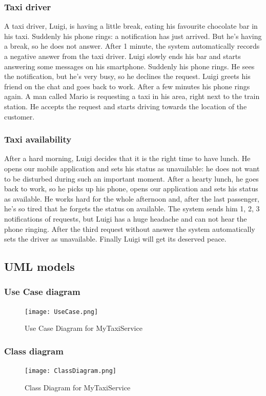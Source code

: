\subsubsection{Taxi driver}
A taxi driver, Luigi, is having a little break, eating his favourite chocolate bar in his taxi. Suddenly
his phone rings: a notification has just arrived. But he's having a break, so he does not answer.
After 1 minute, the system automatically records a negative answer from the taxi driver.
Luigi slowly ends his bar and starts answering some messages on his smartphone. Suddenly his phone
rings. He sees the notification, but he's very busy, so he declines the request. Luigi greets his
friend on the chat and goes back to work. After a few minutes his phone rings again. A man called
Mario is requesting a taxi in his area, right next to the train station. He accepts the request and
starts driving towards the location of the customer.
\subsubsection{Taxi availability}
After a hard morning, Luigi decides that it is the right time to have lunch. He opens our mobile
application and sets his status as unavailable: he does not want to be disturbed during such an
important moment. After a hearty lunch, he goes back to work, so he picks up his phone, opens our
application and sets his status as available. He works hard for the whole afternoon and, after the
last passenger, he's so tired that he forgets the status on available. The system sends him 1, 2, 3
notifications of requests, but Luigi has a huge headache and can not hear the phone ringing. After
the third request without answer the system automatically sets the driver as unavailable.
Finally Luigi will get its deserved peace.
\newpage
\subsection{UML models}
\subsubsection{Use Case diagram}
\begin{figure}[h!]
	\centering
	\graphicspath{ {../SE2_IMAGES/} }
	\texttt{[image: UseCase.png]}
	\caption{Use Case Diagram for MyTaxiService}
\end{figure}
\newpage
\subsubsection{Class diagram}
\begin{figure}[h!]
	\centering
	\graphicspath{ {../SE2_IMAGES/} }
	\texttt{[image: ClassDiagram.png]}
	\caption{Class Diagram for MyTaxiService}
\end{figure}
\newpage
